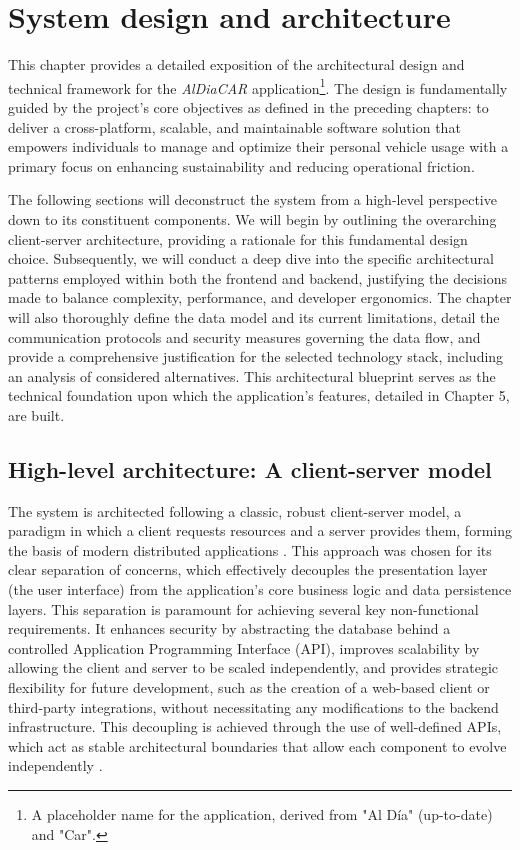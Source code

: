 \chapter{System design and architecture}

This chapter provides a detailed exposition of the architectural design and technical framework for the \textit{AlDiaCAR} application\footnote{A placeholder name for the application, derived from "Al Día" (up-to-date) and "Car".}. The design is fundamentally guided by the project's core objectives as defined in the preceding chapters: to deliver a cross-platform, scalable, and maintainable software solution that empowers individuals to manage and optimize their personal vehicle usage with a primary focus on enhancing sustainability and reducing operational friction.

\textgap

The following sections will deconstruct the system from a high-level perspective down to its constituent components. We will begin by outlining the overarching client-server architecture, providing a rationale for this fundamental design choice. Subsequently, we will conduct a deep dive into the specific architectural patterns employed within both the frontend and backend, justifying the decisions made to balance complexity, performance, and developer ergonomics. The chapter will also thoroughly define the data model and its current limitations, detail the communication protocols and security measures governing the data flow, and provide a comprehensive justification for the selected technology stack, including an analysis of considered alternatives. This architectural blueprint serves as the technical foundation upon which the application's features, detailed in Chapter 5, are built.

\section{High-level architecture: A client-server model}

The system is architected following a classic, robust client-server model, a paradigm in which a client requests resources and a server provides them, forming the basis of modern distributed applications \cite{Tanenbaum2011ComputerNetworks}. This approach was chosen for its clear separation of concerns, which effectively decouples the presentation layer (the user interface) from the application's core business logic and data persistence layers. This separation is paramount for achieving several key non-functional requirements. It enhances security by abstracting the database behind a controlled Application Programming Interface (API), improves scalability by allowing the client and server to be scaled independently, and provides strategic flexibility for future development, such as the creation of a web-based client or third-party integrations, without necessitating any modifications to the backend infrastructure. This decoupling is achieved through the use of well-defined APIs, which act as stable architectural boundaries that allow each component to evolve independently \cite{Martin2017CleanArchitecture}.

